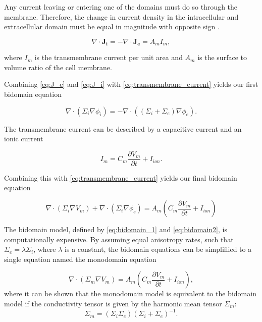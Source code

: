 Any current leaving or entering one of the domains must do so through the membrane. Therefore, the change in current density in the intracellular and extracellular domain must be equal in magnitude with opposite sign \cite{Lines2002_bidomain}.

\begin{equation}
    \nabla \cdot \mathbf{J_i}=-\nabla \cdot \mathbf{J_e}=A_mI_m,
    \label{eq:transmembrane_current}
\end{equation}

where $I_m$ is the transmembrane current per unit area and $A_m$ is the surface to volume ratio of the cell membrane.

Combining \eqref{eq:J_e} and \eqref{eq:J_i} with \eqref{eq:transmembrane_current} yields our first bidomain equation

\begin{equation}
   \nabla \cdot (\Sigma_i \nabla \phi_i) = -\nabla \cdot ((\Sigma_i + \Sigma_e) \nabla \phi_e).
   \label{eq:bidomain_1}
\end{equation}

The transmembrane current can be described by a capacitive current and an ionic current

\begin{equation}
    I_m=C_m\frac{\partial V_m}{\partial t} + I_{ion}.
\end{equation}

Combining this with \eqref{eq:transmembrane_current} yields our final bidomain equation


\begin{equation}
\nabla \cdot (\Sigma_i \nabla V_m) + \nabla \cdot (\Sigma_i \nabla \phi_e) =A_m(C_m\frac{\partial V_m}{\partial t} + I_{ion})
\label{eq:bidomain2}
\end{equation}

The bidomain model, defined by \eqref{eq:bidomain_1} and \eqref{eq:bidomain2}, is computationally expensive. By assuming equal anisotropy rates, such that $\Sigma_e=\lambda \Sigma_i$, where $\lambda$ is a constant, the bidomain equations can be simpliflied to a single equation named the monodomain equation

\begin{equation}
\nabla \cdot (\Sigma_m \nabla V_m)=A_m(C_m\frac{\partial V_m}{\partial t} + I_{ion}),
\label{eq:monodomain}
\end{equation}
where it can be shown that the monodomain model is equivalent to the bidomain model if the conductivity tensor is given by the harmonic mean tensor $\Sigma_m$\cite{openCARP-sw}:
\begin{equation}
    \Sigma_m = (\Sigma_i\Sigma_e)(\Sigma_i + \Sigma_e)^{-1}.
\end{equation}

